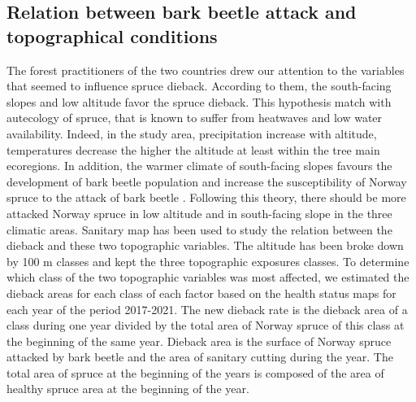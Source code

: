 \documentclass[3p,procedia]{elsarticle}
\begin{document}
\subsection{Relation between bark beetle attack and topographical conditions}

The forest practitioners of the two countries drew our attention to the variables that seemed to influence spruce dieback.
According to them, the south-facing slopes and low altitude favor the spruce dieback.
This hypothesis match with autecology of spruce, that is known to suffer from heatwaves and low water availability.
Indeed, in the study area, precipitation increase with altitude, temperatures decrease the higher the altitude at least within the tree main ecoregions.
In addition, the warmer climate of south-facing slopes favours the development of bark beetle population \citep{annila_influence_1969, baier_phenipscomprehensive_2007, jonsson_2009, marini_climate_2012} and increase the susceptibility of Norway spruce to the attack of bark beetle \citep{wermelinger_ecology_2004, netherer_waterlimiting_2015}.
Following this theory, there should be more attacked Norway spruce in low altitude and in south-facing slope in the three climatic areas.
Sanitary map has been used to study the relation between the dieback and these two topographic variables.
The altitude has been broke down  by 100 m classes and kept the three topographic exposures classes.
To determine which class of the two topographic variables was most affected, we estimated the dieback areas for each class of each factor based on the health status maps for each year of the period 2017-2021.
The  new dieback rate is  the dieback area of a class during one year divided by the total area of Norway spruce of this class at the beginning of the same year. 
Dieback area is the surface of Norway spruce attacked by bark beetle and the area of sanitary cutting during the year. 
The total area of spruce at the beginning of the years is composed of the area of healthy spruce area at the beginning of the year. 





  
			
\end{document}
